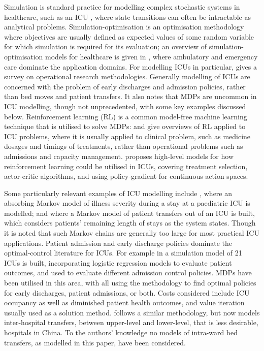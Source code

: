 \documentclass{article}
\begin{document}
Simulation is standard practice for modelling complex stochastic systems in
healthcare, such as an ICU \cite{brailsford09}, where state transitions can
often be intractable as analytical problems.
Simulation-optimisation is an optimisation methodology where objectives are
usually defined as expected values of some random variable for which simulation
is required for its evaluation; an overview of simulation-optimisation models
for healthcare is given in \cite{wang23}, where ambulatory and emergency care
dominate the application domains.
For modelling ICUs in particular, \cite{bai18} gives a survey on operational
research methodologies. Generally modelling of ICUs are concerned with the
problem of early discharges and admission policies, rather than bed moves and
patient transfers.
It also notes that MDPs are uncommon in ICU modelling, though not unprecedented,
with some key examples discussed below.
Reinforcement learning (RL) is a common model-free machine learning technique
that is utilised to solve MDPs: \cite{liu20} and \cite{hong22} give overviews of
RL applied to ICU problems, where it is usually applied to clinical problem,
such as medicine dosages and timings of treatments, rather than operational
problems such as admissions and capacity management.
\cite{roy23} proposes high-level models for how reinforcement learning could be
utilised in ICUs, covering treatment selection, actor-critic algorithms, and
using policy-gradient for continuous action spaces.

Some particularly relevant examples of ICU modelling include \cite{kapadia2000},
where an absorbing Markov model of illness severity during a stay at a
paediatric ICU is modelled; and \cite{dobson10} where a Markov model of patient
transfers out of an ICU is built, which considers patients' remaining length of
stays as the system states.
Though it is noted that such Markov chains are generally too large for most
practical ICU applications.
Patient admission and early discharge policies dominate the optimal-control
literature for ICUs.
For example in \cite{kim15} a simulation model of 21 ICUs is built,
incorporating logistic regression models to evaluate patient outcomes, and used
to evaluate different admission control policies.
MDPs have been utilised in this area, with \cite{chan12, li2015, bai21} all
using the methodology to find optimal policies for early discharges, patient
admissions, or both.
Costs considered include ICU occupancy as well as diminished patient health
outcomes, and value iteration usually used as a solution method.
\cite{du17} follows a similar methodology, but now models inter-hospital
transfers, between upper-level and lower-level, that is less desirable,
hospitals in China.
To the authors' knowledge no models of intra-ward bed transfers, as modelled in
this paper, have been considered.
\end{document}
